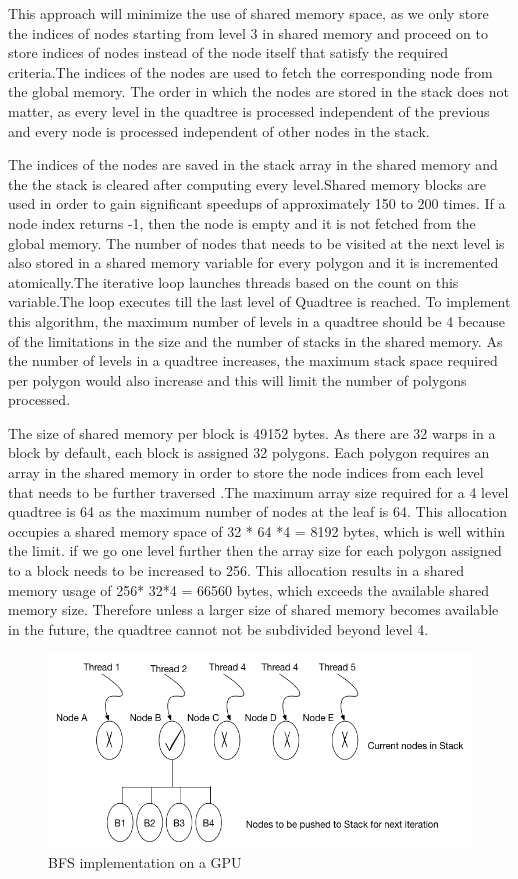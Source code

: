 \documentclass{article}
\begin{document}
This approach will minimize the use of shared memory space, as we only store the indices of nodes starting from level 3 in shared memory and proceed on to store indices of nodes instead of the node itself that satisfy the required criteria.The indices of the nodes are used to fetch the corresponding node from the global memory.
The order in which the nodes are stored in the stack does not matter, as every level in the quadtree is processed independent of the previous and every node is processed independent of other nodes in the stack.

The indices of the nodes are saved in the stack array in the shared memory and the the stack is cleared after computing every level.Shared memory blocks are used in order to gain significant speedups of approximately 150 to 200 times. If a node index returns -1, then the node is empty and it is not fetched from the global memory.
The number of nodes that needs to be visited  at the next level is also stored in a shared memory variable for every polygon and it is incremented atomically.The iterative loop launches threads based on the count on this variable.The loop executes till the last level of Quadtree is reached.
To implement this algorithm, the maximum number of levels in a quadtree should be 4 because of the limitations in the size and the number of stacks in the  shared memory. As the number of levels in a quadtree increases, the maximum stack space required per polygon would also increase and this will limit the number of polygons processed.

The size of shared memory per block is 49152 bytes. As there are 32 warps in a block by default, each block is assigned  32 polygons. Each polygon requires an array in the shared memory in order to store the node indices from each level that needs to be further traversed .The maximum array size required for a 4 level quadtree is 64 as the maximum number of nodes at the leaf is 64. This allocation occupies a shared memory space of 32 * 64 *4 = 8192 bytes, which is well within the limit. if we go one level further then the array size for each polygon assigned to a block needs to be increased to 256. This allocation results in a shared memory usage of 256* 32*4  = 66560 bytes, which exceeds the available shared memory size. Therefore unless a larger size of shared memory becomes available in the future, the quadtree cannot not be subdivided beyond level 4.

\begin{figure}[ht]
\includegraphics[scale=0.5]{BFS}
\caption{BFS implementation on a GPU}
\end{figure}
\end{document}
